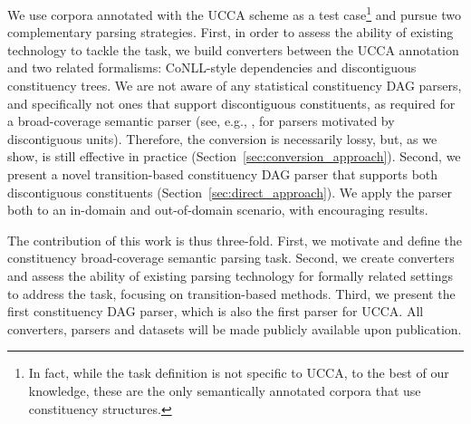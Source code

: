 \documentclass[11pt]{article}
\newcommand{\secref}[1]{Section~\ref{#1}}
\begin{document}
We use corpora annotated with the UCCA scheme \cite{abend2013universal} as a test
case\footnote{In fact, while the task definition is not specific to UCCA,
  to the best of our knowledge, these are the only
  semantically annotated corpora that use constituency structures.}
and pursue two complementary parsing strategies.
First, in order to assess the ability of existing technology to tackle the task,
we build converters between the UCCA annotation and two related formalisms:
CoNLL-style dependencies and discontiguous constituency trees.
We are not aware of any statistical constituency DAG parsers, and specifically not
ones that support discontiguous constituents, as required for a broad-coverage semantic
parser (see, e.g., \cite{pitler2015linear,maier2015discontinuous}, for parsers motivated by discontiguous units). Therefore, the conversion is necessarily lossy, but, as we show, is still effective
in practice (\secref{sec:conversion_approach}).
Second, we present a novel transition-based
constituency DAG parser that supports both discontiguous constituents (\secref{sec:direct_approach}). 
We apply the parser both to an in-domain and out-of-domain
scenario, with encouraging results.


The contribution of this work is thus three-fold.
First, we motivate and define the constituency broad-coverage semantic parsing task.
Second, we create converters and assess the ability of existing parsing technology
for formally related settings to address the task, focusing on transition-based methods.
Third, we present the first constituency DAG parser, which is also the
first parser for UCCA. 
All converters, parsers and datasets will be made publicly available upon publication.
\end{document}

